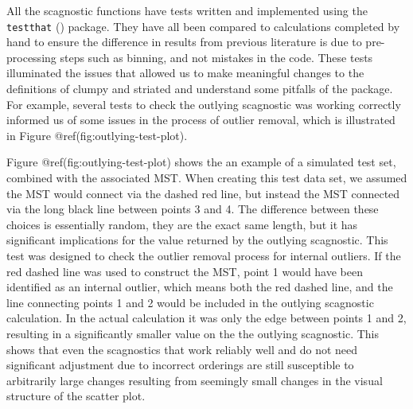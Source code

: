 All the scagnostic functions have tests written and implemented using
the \texttt{testthat} (\citet{testthat}) package. They have all been
compared to calculations completed by hand to ensure the difference in
results from previous literature is due to pre-processing steps such as
binning, and not mistakes in the code. These tests illuminated the
issues that allowed us to make meaningful changes to the definitions of
clumpy and striated and understand some pitfalls of the package. For
example, several tests to check the outlying scagnostic was working
correctly informed us of some issues in the process of outlier removal,
which is illustrated in Figure @ref(fig:outlying-test-plot).

Figure @ref(fig:outlying-test-plot) shows the an example of a simulated
test set, combined with the associated MST. When creating this test data
set, we assumed the MST would connect via the dashed red line, but
instead the MST connected via the long black line between points 3 and
4. The difference between these choices is essentially random, they are
the exact same length, but it has significant implications for the value
returned by the outlying scagnostic. This test was designed to check the
outlier removal process for internal outliers. If the red dashed line
was used to construct the MST, point 1 would have been identified as an
internal outlier, which means both the red dashed line, and the line
connecting points 1 and 2 would be included in the outlying scagnostic
calculation. In the actual calculation it was only the edge between
points 1 and 2, resulting in a significantly smaller value on the the
outlying scagnostic. This shows that even the scagnostics that work
reliably well and do not need significant adjustment due to incorrect
orderings are still susceptible to arbitrarily large changes resulting
from seemingly small changes in the visual structure of the scatter
plot.

